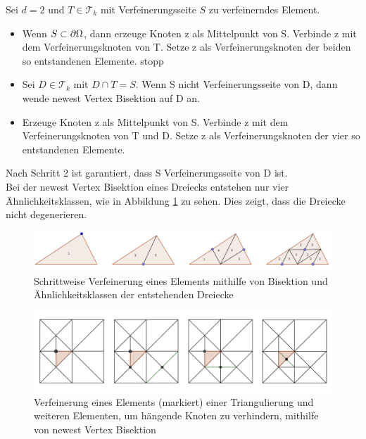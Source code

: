 \begin{algorithmus}
	Sei $d=2$ und $T\in \mathscr{T}_k$ mit Verfeinerungsseite $S$ zu verfeinerndes Element.
	\begin{itemize}
		\item[(1)] Wenn $S \subset \partial \Omega$, dann erzeuge Knoten z als Mittelpunkt von S. Verbinde z mit dem Verfeinerungsknoten von T. Setze z als Verfeinerungsknoten der beiden so entstandenen Elemente. stopp  
		\item[(2)] Sei $D \in \mathscr{T}_k$ mit $D\cap T = S$. Wenn S nicht Verfeinerungsseite von D, dann wende newest Vertex Bisektion auf D an.
		\item[(3)] Erzeuge Knoten z als Mittelpunkt von S. Verbinde z mit dem Verfeinerungsknoten von T und D. Setze z als Verfeinerungsknoten der vier so entstandenen Elemente.
	\end{itemize}
\end{algorithmus}
Nach Schritt 2 ist garantiert, dass S Verfeinerungsseite von D ist. \\
Bei der newest Vertex Bisektion eines Dreiecks entstehen nur vier Ähnlichkeitsklassen, wie in Abbildung \ref{schbisek} zu sehen. Dies zeigt, dass die Dreiecke nicht degenerieren.
\begin{figure}[!htbp]
	\begin{center}
		\includegraphics[width=16cm]{pics/bisec1.png}
	\end{center}
	\caption{\label{schbisek}Schrittweise Verfeinerung eines Elements mithilfe von Bisektion und Ähnlichkeitsklassen der entstehenden Dreiecke}
\end{figure}

\begin{figure}[!htbp]
	\begin{center}
		\includegraphics[width=16cm]{pics/bisec2.png}
	\end{center}
	\caption{\label{bisec}Verfeinerung eines Elements (markiert) einer Triangulierung und weiteren Elementen, um hängende Knoten zu verhindern, mithilfe von newest Vertex Bisektion}
\end{figure}

